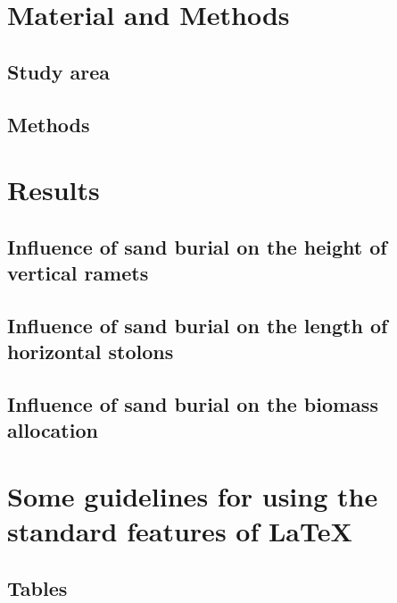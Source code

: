 \documentclass[]{interact}
\theoremstyle{plain}%
\theoremstyle{definition}
\theoremstyle{remark}
\begin{document}
\section{Material and Methods}
\subsection{Study area}

\subsection{Methods}


\section{Results}

\subsection{Influence of sand burial on the height of vertical ramets}


\subsection{Influence of sand burial on the length of horizontal stolons}


\subsection{Influence of sand burial on the biomass allocation}


\section{Some guidelines for using the standard features of \LaTeX}


\subsection{Tables}
\end{document}
